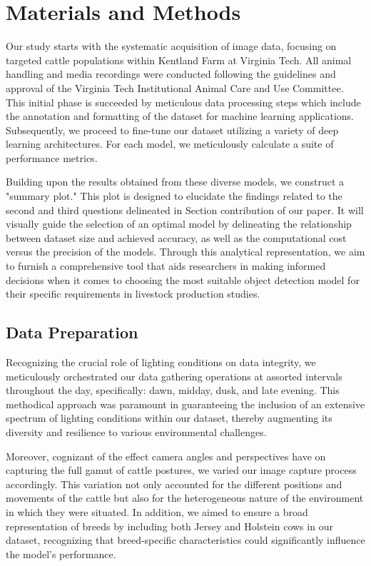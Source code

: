 \section{Materials and Methods}

Our study starts with the systematic acquisition of image data, focusing on targeted cattle populations within Kentland Farm at Virginia Tech. All animal handling and media recordings were conducted following the guidelines and approval of the Virginia Tech Institutional Animal Care and Use Committee. This initial phase is succeeded by meticulous data processing steps which include the annotation and formatting of the dataset for machine learning applications. Subsequently, we proceed to fine-tune our dataset utilizing a variety of deep learning architectures. For each model, we meticulously calculate a suite of performance metrics.

Building upon the results obtained from these diverse models, we construct a "summary plot." This plot is designed to elucidate the findings related to the second and third questions delineated in Section {contribution} of our paper. It will visually guide the selection of an optimal model by delineating the relationship between dataset size and achieved accuracy, as well as the computational cost versus the precision of the models. Through this analytical representation, we aim to furnish a comprehensive tool that aids researchers in making informed decisions when it comes to choosing the most suitable object detection model for their specific requirements in livestock production studies.

\subsection*{Data Preparation}


Recognizing the crucial role of lighting conditions on data integrity, we meticulously orchestrated our data gathering operations at assorted intervals throughout the day, specifically: dawn, midday, dusk, and late evening. This methodical approach was paramount in guaranteeing the inclusion of an extensive spectrum of lighting conditions within our dataset, thereby augmenting its diversity and resilience to various environmental challenges.

Moreover, cognizant of the effect camera angles and perspectives have on capturing the full gamut of cattle postures, we varied our image capture process accordingly. This variation not only accounted for the different positions and movements of the cattle but also for the heterogeneous nature of the environment in which they were situated. In addition, we aimed to ensure a broad representation of breeds by including both Jersey and Holstein cows in our dataset, recognizing that breed-specific characteristics could significantly influence the model's performance.

